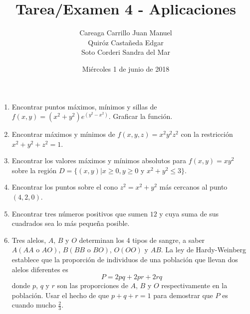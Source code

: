 \documentclass{article}
\begin{document}
        \title{Tarea/Examen 4 - Aplicaciones}
        \author{Careaga Carrillo Juan Manuel \\ Quiróz Castañeda Edgar \\ Soto Corderi Sandra del Mar}
        \date{Miércoles 1 de junio de 2018}
        \maketitle

        \begin{enumerate}
            \item {
                Encontrar puntos máximos, mínimos y sillas de $f(x,y)=(x^2+y^2)e^{(y^2-x^2)}$.
                Graficar la función.

                \color{azul}
            }
            \item {
                Encontrar máximos y mínimos de $f(x,y,z)=x^2y^2z^2$ con la restricción
                $x^2+y^2+z^2=1$.

                \color{azul}
            }
            \item {
                Encontrar los valores máximos y mínimos absolutos para $f(x,y)=xy^2$ sobre
                la región $D=\{(x,y)|x\geq 0, y\geq 0 \text{ y } x^2+y^2\leq 3\}$.

                \color{azul}
            }
            \item {
                Encontrar los puntos sobre el cono $z^2=x^2+y^2$ más cercanos al punto
                $(4,2,0)$.

                \color{azul}
            }
            \item {
                Encontrar tres números positivos que sumen $12$ y cuya suma de sus cuadrados
                sea lo más pequeña posible.

                \color{azul}
            }
            \item {
                Tres alelos, $A$, $B$ y $O$ determinan los 4 tipos de sangre, a saber
                $A(AA \text{ o } AO)$, $B(BB \text{ o } BO)$, $O(OO)$ y $AB$. La ley
                de Hardy-Weinberg establece que la proporción de individuos de una
                población que llevan dos alelos diferentes es
                \[ P=2pq+2pr+2rq \]
                donde $p$, $q$ y $r$ son las proporciones de $A$, $B$ y $O$ respectivamente
                en la población. Usar el hecho de que $p+q+r=1$ para demostrar que $P$
                es cuando mucho $\frac{2}{3}$.

}
\end{enumerate}
\end{document}
